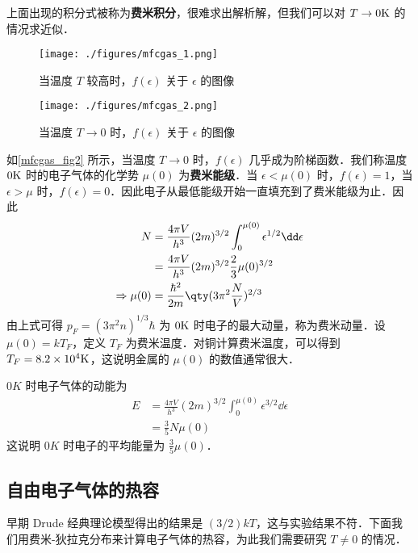 上面出现的积分式被称为\textbf{费米积分}，很难求出解析解，但我们可以对 $T\rightarrow 0 \rm{K}$ 的情况求近似．
\begin{figure}[ht]
\centering
\texttt{[image: ./figures/mfcgas\_1.png]}
\caption{当温度 $T$ 较高时，$f(\epsilon )$ 关于 $\epsilon$ 的图像} \label{mfcgas_fig1}
\end{figure}
\begin{figure}[ht]
\centering
\texttt{[image: ./figures/mfcgas\_2.png]}
\caption{当温度 $T\rightarrow 0$ 时，$f(\epsilon )$ 关于 $\epsilon$ 的图像} \label{mfcgas_fig2}
\end{figure}

如\autoref{mfcgas_fig2} 所示，当温度 $T\rightarrow 0$ 时，$f(\epsilon)$ 几乎成为阶梯函数．我们称温度 $0\rm{K}$ 时的电子气体的化学势 $\mu(0)$ 为\textbf{费米能级}．当 $\epsilon<\mu(0)$ 时，$f(\epsilon)=1$，当 $\epsilon>\mu$ 时，$f(\epsilon)=0$．因此电子从最低能级开始一直填充到了费米能级为止．因此
\begin{equation}
\begin{aligned}
N&=\frac{4\pi V}{h^3}(2m)^{3/2}\int_0^{\mu(0)}\epsilon^{1/2}\dd \epsilon
\\
&=\frac{4\pi V}{h^3}(2m)^{3/2}\frac{2}{3}\mu(0)^{3/2}\\
\Rightarrow \mu(0)&=\frac{\hbar^2}{2m}\qty(3\pi^2\frac{N}{V})^{2/3}
\end{aligned}
\end{equation}
由上式可得 $p_F=(3\pi^2n)^{1/3}\hbar$ 为 $0\rm{K}$ 时电子的最大动量，称为费米动量．设 $\mu(0)=kT_F$，定义 $T_F$ 为费米温度．对铜计算费米温度，可以得到 $T_F=8.2\times 10^4 \rm{K}$，这说明金属的 $\mu(0)$ 的数值通常很大．

$0K$ 时电子气体的动能为
\begin{equation}
\begin{aligned}
E&=\frac{4\pi V}{h^3}(2m)^{3/2}\int_0^{\mu(0)} \epsilon^{3/2}\dd \epsilon\\
&=\frac{3}{5}N\mu(0)
\end{aligned}
\end{equation}
这说明 $0K$ 时电子的平均能量为 $\frac{3}{5}\mu(0)$．
\subsection{自由电子气体的热容}
早期 Drude 经典理论模型得出的结果是 $(3/2)k T$，这与实验结果不符．下面我们用费米-狄拉克分布来计算电子气体的热容，为此我们需要研究 $T\neq 0$ 的情况．


